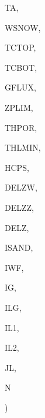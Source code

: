{\begin{DoxyParamCaption}
\item[{real, dimension    (ilg)}]{T\+A, }
\item[{real, dimension (ilg)}]{W\+S\+N\+O\+W, }
\item[{real, dimension (ilg,ig)}]{T\+C\+T\+O\+P, }
\item[{real, dimension (ilg,ig)}]{T\+C\+B\+O\+T, }
\item[{real, dimension (ilg,ig)}]{G\+F\+L\+U\+X, }
\item[{real, dimension (ilg)}]{Z\+P\+L\+I\+M, }
\item[{real, dimension (ilg,ig)}]{T\+H\+P\+O\+R, }
\item[{real, dimension(ilg,ig)}]{T\+H\+L\+M\+I\+N, }
\item[{real, dimension  (ilg,ig)}]{H\+C\+P\+S, }
\item[{real, dimension (ilg,ig)}]{D\+E\+L\+Z\+W, }
\item[{real, dimension (ilg,ig)}]{D\+E\+L\+Z\+Z, }
\item[{real, dimension  (ig)}]{D\+E\+L\+Z, }
\item[{integer, dimension (ilg,ig)}]{I\+S\+A\+N\+D, }
\item[{integer}]{I\+W\+F, }
\item[{integer}]{I\+G, }
\item[{integer}]{I\+L\+G, }
\item[{integer}]{I\+L1, }
\item[{integer}]{I\+L2, }
\item[{integer}]{J\+L, }
\item[{integer}]{N}
\end{DoxyParamCaption}
)}\label{TMCALC_8f_a5ad5bd585e1ef7d89e9862d0bacd3c51}


